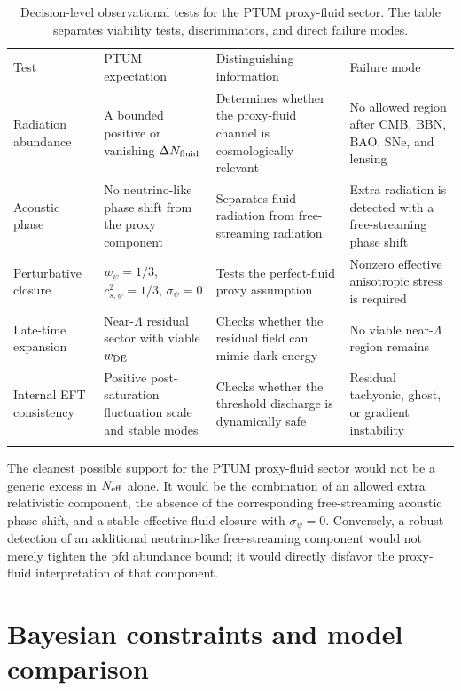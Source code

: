 \documentclass[epj]{svjour}
\begin{document}
\begin{table}[t]
\caption{Decision-level observational tests for the PTUM proxy-fluid sector.
The table separates viability tests, discriminators, and direct failure modes.}
\label{tab:decision_tests}
\centering
\small
\begin{tabular}{p{}p{}p{}p{}}
\hline\noalign{\smallskip}
Test & PTUM expectation & Distinguishing information & Failure mode \\
\noalign{\smallskip}\hline\noalign{\smallskip}
Radiation abundance & A bounded positive or vanishing
\(\Delta N_{\rm fluid}\) & Determines whether the proxy-fluid channel is
cosmologically relevant & No allowed region after CMB, BBN, BAO, SNe, and lensing \\
Acoustic phase & No neutrino-like phase shift from the proxy component & Separates fluid radiation from free-streaming radiation & Extra radiation is detected with a free-streaming phase shift \\
Perturbative closure & \(w_\psi=1/3\), \(c_{s,\psi}^2=1/3\), \(\sigma_\psi=0\) & Tests the perfect-fluid proxy assumption & Nonzero effective anisotropic stress is required \\
Late-time expansion & Near-\(\Lambda\) residual sector with viable \(w_{\rm DE}\) & Checks whether the residual field can mimic dark energy & No viable near-\(\Lambda\) region remains \\
Internal EFT consistency & Positive post-saturation fluctuation scale and stable modes & Checks whether the threshold discharge is dynamically safe & Residual tachyonic, ghost, or gradient instability \\
\noalign{\smallskip}\hline
\end{tabular}
\end{table}

The cleanest possible support for the PTUM proxy-fluid sector would not be a
generic excess in \(N_{\rm eff}\) alone.  It would be the combination of an
allowed extra relativistic component, the absence of the corresponding
free-streaming acoustic phase shift, and a stable effective-fluid closure with
\(\sigma_\psi=0\).  Conversely, a robust detection of an additional
neutrino-like free-streaming component would not merely tighten the pfd
abundance bound; it would directly disfavor the proxy-fluid interpretation of
that component.

\section{Bayesian constraints and model comparison}
\label{sec:mcmc}
\end{document}
